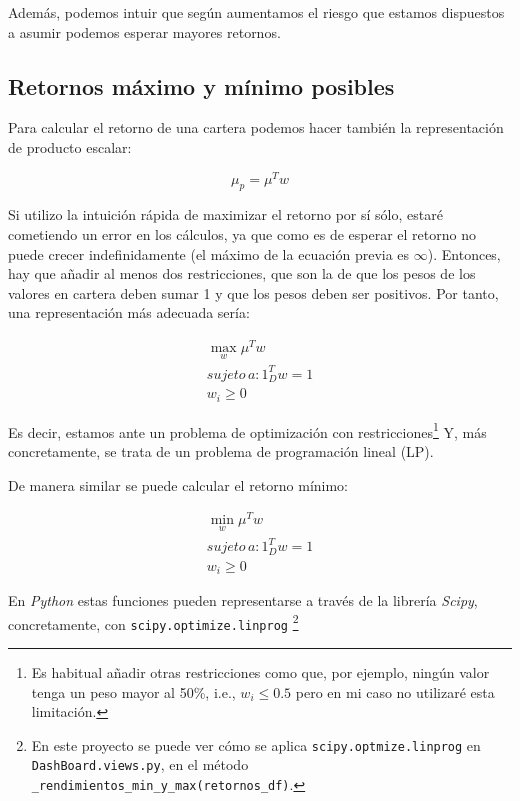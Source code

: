 Además, podemos intuir que según aumentamos el riesgo que estamos dispuestos a asumir podemos esperar mayores retornos. 

\subsection{Retornos máximo y mínimo posibles}

Para calcular el retorno de una cartera podemos hacer también la representación de producto escalar:

\begin{equation}
	\mu_{p} = \mu^{T}w
\end{equation}

Si utilizo la intuición rápida de maximizar el retorno por sí sólo, estaré cometiendo un error en los cálculos, ya que como es de esperar el retorno no puede crecer indefinidamente (el máximo de la ecuación previa es $\infty$). Entonces, hay que añadir al menos dos restricciones, que son la de que los pesos de los valores en cartera deben sumar 1 y que los pesos deben ser positivos. Por tanto, una representación más adecuada sería:

\begin{equation}
\begin{aligned}
	\max_{w} \mu^{T}w \\
	sujeto\, a: 1_{D}^{T}w = 1 \\
	w_{i} \geq 0
\end{aligned}
\end{equation}

Es decir, estamos ante un problema de optimización con restricciones\footnote{Es habitual añadir otras restricciones como que, por ejemplo, ningún valor tenga un peso mayor al 50\%, i.e., $w_{i} \leq 0.5$ pero en mi caso no utilizaré esta limitación.} Y, más concretamente, se trata de un problema de programación lineal (LP)\citep{wiki:programacion_lineal}. 

De manera similar se puede calcular el retorno mínimo:

\begin{equation}
\begin{aligned}
	\min_{w} \mu^{T}w \\
	sujeto\, a: 1_{D}^{T}w = 1 \\
	w_{i} \geq 0
\end{aligned}
\end{equation}

En \emph{Python} estas funciones pueden representarse a través de la librería \emph{Scipy}, concretamente, con \texttt{scipy.optimize.linprog} \footnote{En este proyecto se puede ver cómo se aplica \texttt{scipy.optmize.linprog} en \texttt{DashBoard.views.py}, en el método \texttt{\_rendimientos\_min\_y\_max(retornos\_df)}.}

